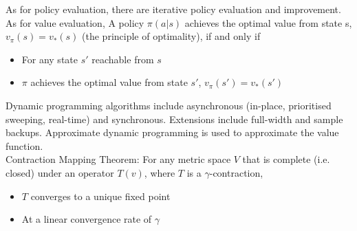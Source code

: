 \documentclass[10pt,twocolumn,letterpaper]{article}
\begin{document}
As for policy evaluation, there are iterative policy evaluation and improvement. 
As for value evaluation, A policy $\pi (a|s)$ achieves the optimal value from state s, $v_\pi (s) = v_\ast(s)$ (the principle of optimality), if and only if
\begin{itemize}
	\item For any state $s'$ reachable from $s$
	\item $\pi$ achieves the optimal value from state $s'$, $v_\pi (s') = v_\ast (s')$	 
\end{itemize}
Dynamic programming algorithms include asynchronous (in-place, prioritised sweeping, real-time) and synchronous. Extensions include full-width and sample backups. Approximate dynamic programming is used to approximate the value function.\\
Contraction Mapping Theorem:
For any metric space $V$ that is complete (i.e. closed) under an
operator $T(v)$, where $T$ is a $\gamma$-contraction,
\begin{itemize}
	\item $T$ converges to a unique fixed point
	\item At a linear convergence rate of 
$\gamma$
\end{itemize}
%
\end{document}
